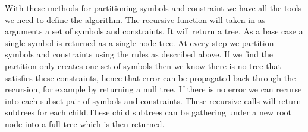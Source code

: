 With these methods for partitioning symbols and constraint we have all the tools we need to define the  algorithm. The recursive  function will taken in as arguments a set of symbols and constraints. It will return a tree. As a base case a single symbol is returned as a single node tree. At every step we partition symbols and constraints using the rules as described above. If we find the partition only creates one set of symbols then we know there is no tree that satisfies these constraints, hence that error can be propagated back through the recursion, for example by returning a null tree. If there is no error we can recurse into each subset pair of symbols and constraints. These recursive calls will return subtrees for each child.These child subtrees can be gathering under a new root node into a full tree which is then returned.    

